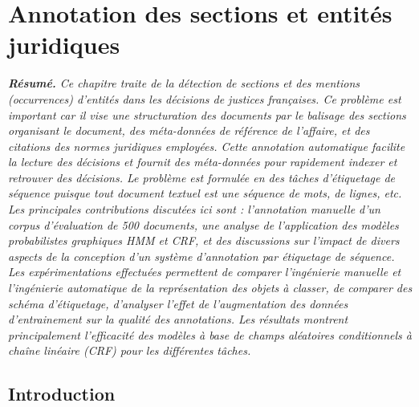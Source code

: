 \chapter{Annotation des sections et entités juridiques}
\label{chap:structuration}


\textit{\small \textbf{Résumé.} Ce chapitre traite de la détection de sections et des mentions (occurrences) d'entités dans les décisions de justices françaises. Ce problème est important car il vise une structuration des documents par le balisage des sections organisant le document, des méta-données de référence de l'affaire, et des citations des normes juridiques employées. Cette annotation automatique facilite la lecture des décisions et fournit des méta-données pour rapidement indexer et retrouver des  décisions. Le problème est formulée en des tâches d'étiquetage de séquence puisque tout document textuel est une séquence de mots, de lignes, etc. Les principales contributions discutées ici sont : l'annotation manuelle d'un corpus d'évaluation de 500 documents, une analyse de l'application des modèles probabilistes graphiques HMM et CRF, et des discussions sur l'impact de divers aspects de la conception d'un système d'annotation par étiquetage de séquence. Les expérimentations effectuées permettent de comparer l'ingénierie manuelle et l'ingénierie automatique de la représentation des objets à classer, de comparer des schéma d'étiquetage, d'analyser l'effet de l'augmentation des données d'entrainement sur la qualité des annotations. Les résultats montrent principalement l'efficacité des modèles à base de champs aléatoires conditionnels à chaîne linéaire (CRF) pour les différentes tâches.}


\section{Introduction}
\label{sec:structuration:motivation}

